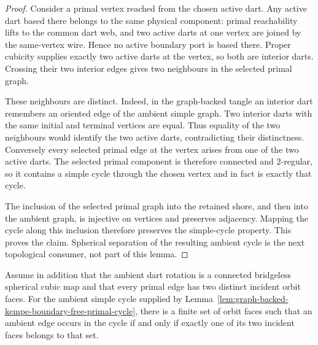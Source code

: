 \begin{proof}
Consider a primal vertex reached from the chosen active dart.  Any active dart
based there belongs to the same physical component: primal reachability lifts
to the common dart web, and two active darts at one vertex are joined by the
same-vertex wire.  Hence no active boundary port is based there.  Proper
cubicity supplies exactly two active darts at the vertex, so both are interior
darts.  Crossing their two interior edges gives two neighbours in the selected
primal graph.

These neighbours are distinct.  Indeed, in the graph-backed tangle an
interior dart remembers an oriented edge of the ambient simple graph.  Two
interior darts with the same initial and terminal vertices are equal.  Thus
equality of the two neighbours would identify the two active darts,
contradicting their distinctness.  Conversely every selected primal edge at
the vertex arises from one of the two active darts.  The selected primal
component is therefore connected and $2$-regular, so it contains a simple
cycle through the chosen vertex and in fact is exactly that cycle.

The inclusion of the selected primal graph into the retained shore, and then
into the ambient graph, is injective on vertices and preserves adjacency.
Mapping the cycle along this inclusion therefore preserves the simple-cycle
property.  This proves the claim.  Spherical separation of the resulting
ambient cycle is the next topological consumer, not part of this lemma.
\end{proof}

\begin{lemma}
\label{lem:graph-backed-kempe-boundary-free-face-separator}
Assume in addition that the ambient dart rotation is a connected bridgeless
spherical cubic map and that every primal edge has two distinct incident
orbit faces.  For the ambient simple cycle supplied by
Lemma~\ref{lem:graph-backed-kempe-boundary-free-primal-cycle}, there is a
finite set of orbit faces such that an ambient edge occurs in the cycle if
and only if exactly one of its two incident faces belongs to that set.
\end{lemma}

